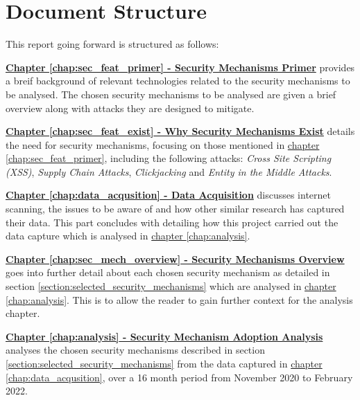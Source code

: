 \documentclass{mscreport}
\begin{document}
\newpage

\section*{Document Structure}
\label{section:doc_struct}

This report going forward is structured as follows:

\vspace{0.3cm} \noindent
\hyperref[chap:sec_feat_primer]{\textbf{Chapter \ref{chap:sec_feat_primer} - Security Mechanisms Primer}} provides a breif background of relevant technologies related to the security mechanisms to be analysed. The chosen security mechanisms to be analysed are given a brief overview along with attacks they are designed to mitigate.

\vspace{0.3cm} \noindent
\hyperref[chap:sec_feat_exist]{\textbf{Chapter \ref{chap:sec_feat_exist} - Why Security Mechanisms Exist}} details the need for security mechanisms, focusing on those mentioned in \hyperref[chap:sec_feat_primer]{chapter \ref{chap:sec_feat_primer}}, including the following attacks: \textit{Cross Site Scripting (XSS)}, \textit{Supply Chain Attacks}, \textit{Clickjacking} and \textit{Entity in the Middle Attacks}.

\vspace{0.3cm} \noindent
\hyperref[chap:data_acqusition]{\textbf{Chapter \ref{chap:data_acqusition} - Data Acquisition}} discusses internet scanning, the issues to be aware of and how other similar research has captured their data. This part concludes with detailing how this project carried out the data capture which is analysed in \hyperref[chap:analysis]{chapter \ref{chap:analysis}}.

\vspace{0.3cm} \noindent
\hyperref[chap:sec_mech_overview]{\textbf{Chapter \ref{chap:sec_mech_overview} - Security Mechanisms Overview}} goes into further detail about each chosen security mechanism as detailed in section \ref{section:selected_security_mechanisms} which are analysed in \hyperref[chap:analysis]{chapter \ref{chap:analysis}}. This is to allow the reader to gain further context for the analysis chapter.

\vspace{0.3cm} \noindent
\hyperref[chap:analysis]{\textbf{Chapter \ref{chap:analysis} - Security Mechanism Adoption Analysis}} analyses the chosen security mechanisms described in section \ref{section:selected_security_mechanisms} from the data captured in \hyperref[chap:analysis]{chapter \ref{chap:data_acqusition}}, over a 16 month period from November 2020 to February 2022.
\end{document}

